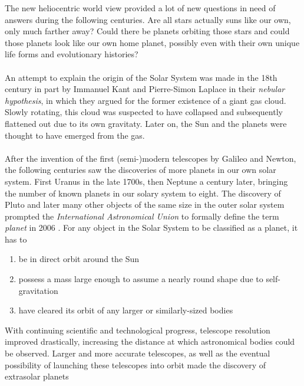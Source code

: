     \newpage \noindent
    The new heliocentric world view provided a lot of new questions in need of 
    answers during the following centuries. Are all stars actually suns like 
    our own, only much farther away? Could there be planets orbiting those 
    stars and could those planets look like our own home planet, possibly 
    even with their own unique life forms and evolutionary histories? \\
    \\
    An attempt to explain the origin of the Solar System was made in the 18th
    century in part by Immanuel Kant and Pierre-Simon Laplace in their
    \textit{nebular hypothesis}, in which they
    argued for the former existence of a giant gas cloud. Slowly rotating,
    this cloud was suspected to have collapsed and subsequently flattened out
    due to its own gravitaty. Later on, the Sun and the planets were thought 
    to have emerged from the gas. \\
    \\
    After the invention of the first (semi-)modern telescopes by 
    Galileo and Newton, the following centuries saw the discoveries of more 
    planets in our own solar system.
    First Uranus in the late 1700s, then Neptune a century later, bringing the 
    number of known planets in our solary system to eight.
    The discovery of Pluto and later many other objects of the same size in the 
    outer solar system prompted the \textit{International Astronomical Union} to 
    formally define the term \textit{planet} in 2006 \cite{IAU_planet_def}.
    For any object in the Solar System to be classified as a planet, it has to
    \begin{enumerate}
      \setlength{\itemsep}{2pt}%
      \setlength{\parskip}{0pt}%
      \item be in direct orbit around the Sun
      \item possess a mass large enough to assume a nearly round shape due 
        to self-gravitation
      \item have cleared its orbit of any larger or similarly-sized bodies
    \end{enumerate}
    With continuing scientific and technological progress, telescope resolution 
    improved drastically, increasing the distance at which astronomical 
    bodies could be observed. Larger and more 
    accurate telescopes, as well as the eventual possibility of launching 
    these telescopes into orbit made the discovery of extrasolar planets 
